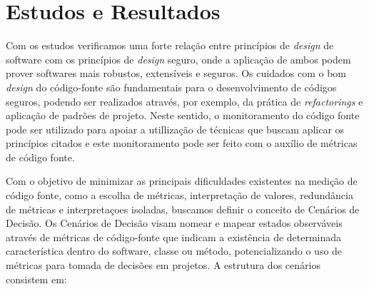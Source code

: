 \section{Estudos e Resultados}
\label{sec:studies}


Com os estudos verificamos uma forte relação entre princípios de \emph{design} de software com os princípios de \emph{design} seguro, onde a aplicação de ambos podem prover softwares mais robustos, extensíveis e seguros. Os cuidados com o bom \emph{design} do código-fonte são fundamentais para o desenvolvimento de códigos seguros, podendo ser realizados através, por exemplo, da prática de \emph{refactorings} e aplicação de padrões de projeto. Neste sentido, o monitoramento do código fonte pode ser utilizado para apoiar a utillização de técnicas que buscam aplicar os princípios citados e este monitoramento pode ser feito com o auxílio de métricas de código fonte.

Com o objetivo de minimizar as principais dificuldades existentes na medição de código fonte, como a escolha de métricas, interpretação de valores, redundância de métricas e interpretaçoes isoladas, buscamos definir o conceito de Cenários de Decisão. Os Cenários de Decisão  visam nomear e mapear estados observáveis através de métricas de código-fonte que indicam a existência de determinada característica dentro do software, classe ou método, potencializando o uso de métricas para tomada de decisões em projetos. A estrutura dos cenários consistem em:

